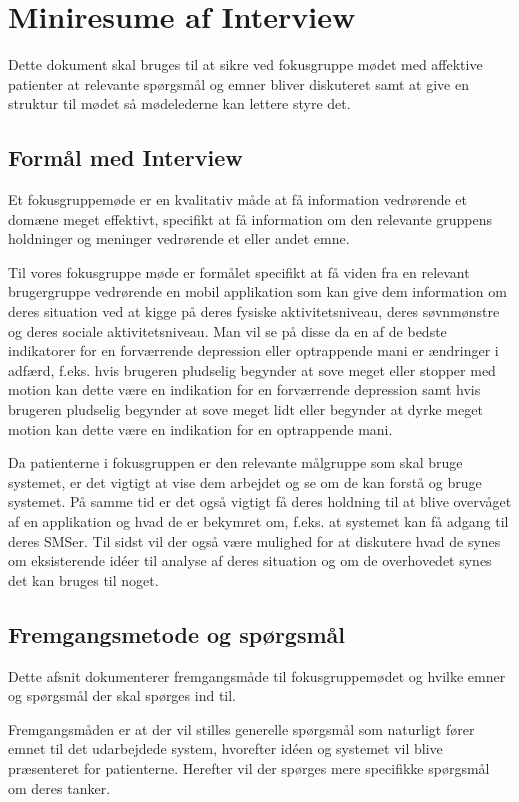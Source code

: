 \chapter{Miniresume af Interview}
Dette dokument skal bruges til at sikre ved fokusgruppe mødet med affektive patienter at relevante spørgsmål og emner bliver diskuteret samt at give en struktur til mødet så mødelederne kan lettere styre det.

\section{Formål med Interview}
Et fokusgruppemøde er en kvalitativ måde at få information vedrørende et domæne meget effektivt, specifikt at få information om den relevante gruppens holdninger og meninger vedrørende et eller andet emne.

Til vores fokusgruppe møde er formålet specifikt at få viden fra en relevant brugergruppe vedrørende en mobil applikation som kan give dem information om deres situation ved at kigge på deres fysiske aktivitetsniveau, deres søvnmønstre og deres sociale aktivitetsniveau. Man vil se på disse da en af de bedste indikatorer for en forværrende depression eller optrappende mani er ændringer i adfærd, f.eks. hvis brugeren pludselig begynder at sove meget eller stopper med motion kan dette være en indikation for en forværrende depression samt hvis brugeren pludselig begynder at sove meget lidt eller begynder at dyrke meget motion kan dette være en indikation for en optrappende mani.
 
Da patienterne i fokusgruppen er den relevante målgruppe som skal bruge systemet, er det vigtigt at vise dem arbejdet og se om de kan forstå og bruge systemet. På samme tid er det også vigtigt få deres holdning til at blive overvåget af en applikation og hvad de er bekymret om, f.eks. at systemet kan få adgang til deres SMSer. Til sidst vil der også være mulighed for at diskutere hvad de synes om eksisterende idéer til analyse af deres situation og om de overhovedet synes det kan bruges til noget.

\section{Fremgangsmetode og spørgsmål}
Dette afsnit dokumenterer fremgangsmåde til fokusgruppemødet og hvilke emner og spørgsmål der skal spørges ind til.

Fremgangsmåden er at der vil stilles generelle spørgsmål som naturligt fører emnet til det udarbejdede system, hvorefter idéen og systemet vil blive præsenteret for patienterne. Herefter vil der spørges mere specifikke spørgsmål om deres tanker.

